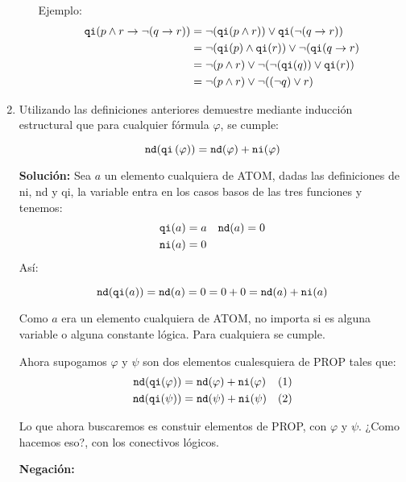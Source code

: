\documentclass[8pt, letterpaper]{article}
\begin{document}
\begin{enumerate}
\begin{enumerate}
    Ejemplo:
    \begin{align*}
      {\tt qi} (p \land r \to \lnot (q \to r)) &= \neg({\tt qi}(p \land r))
      \lor {\tt qi}(\lnot (q \to r)) \\
      &= \neg({\tt qi}(p) \land {\tt qi}(r)) \lor \neg({\tt qi}(q \to r) \\
      &= \neg(p \land r) \lor \neg(\neg({\tt qi}(q)) \lor {\tt qi}(r))\\
      &= \neg(p \land r) \lor \neg((\neg q) \lor r)\\
    \end{align*}
  \end{enumerate}

  \newpage
  \rmfamily
\item Utilizando las definiciones anteriores demuestre mediante inducción
  estructural que para cualquier fórmula $\varphi$, se cumple:
  
  $${\tt nd}({\tt qi}\,(\varphi)) = {\tt nd}(\varphi) + {\tt ni}(\varphi)$$

  \ttfamily
  {\bf Solución:}
  \hfill\break
  Sea $a$ un elemento cualquiera de ATOM, dadas las definiciones
  de ni, nd y qi, la variable entra en los casos basos de las tres funciones
  y tenemos:
  \begin{align*}
    {\tt qi}(a) &= a & {\tt nd}(a) &= 0 \\
    {\tt ni}(a) &= 0
  \end{align*}
  Así:
  
  $${\tt nd}({\tt qi}(a)) = {\tt nd}(a) = 0 = 0 + 0 = {\tt nd}(a) + {\tt ni}
  (a)$$

  Como $a$ era un elemento cualquiera de ATOM, no importa si es alguna variable
  o alguna constante lógica. Para cualquiera se cumple.

  Ahora supogamos $\varphi$ y $\psi$ son dos elementos cualesquiera de PROP
  tales que:
  \begin{align*}
    {\tt nd}({\tt qi}(\varphi)) &= {\tt nd}(\varphi) + {\tt ni}(\varphi) & (1)\\
    {\tt nd}({\tt qi}(\psi)) &= {\tt nd}(\psi) + {\tt ni}(\psi) & (2)
  \end{align*}
  
  Lo que ahora buscaremos  es constuir elementos de PROP, con $\varphi$ y
  $\psi$. ¿Como hacemos eso?, con los conectivos lógicos.
  
  \hfill\break
  {\bf Negación:}


\end{enumerate}
\end{document}
